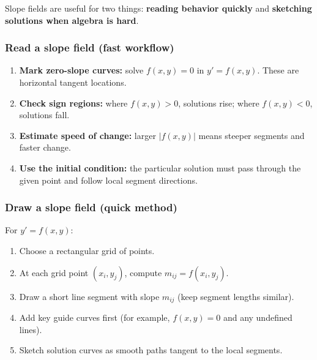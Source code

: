 Slope fields are useful for two things: \textbf{reading behavior quickly} and \textbf{sketching solutions when algebra is hard}.

\subsubsection*{Read a slope field (fast workflow)}
\begin{enumerate}[leftmargin=*]
  \item \textbf{Mark zero-slope curves:} solve $f(x,y)=0$ in $y'=f(x,y)$. These are horizontal tangent locations.
  \item \textbf{Check sign regions:} where $f(x,y)>0$, solutions rise; where $f(x,y)<0$, solutions fall.
  \item \textbf{Estimate speed of change:} larger $|f(x,y)|$ means steeper segments and faster change.
  \item \textbf{Use the initial condition:} the particular solution must pass through the given point and follow local segment directions.
\end{enumerate}

\subsubsection*{Draw a slope field (quick method)}
For $y'=f(x,y)$:
\begin{enumerate}[leftmargin=*]
  \item Choose a rectangular grid of points.
  \item At each grid point $(x_i,y_j)$, compute $m_{ij}=f(x_i,y_j)$.
  \item Draw a short line segment with slope $m_{ij}$ (keep segment lengths similar).
  \item Add key guide curves first (for example, $f(x,y)=0$ and any undefined lines).
  \item Sketch solution curves as smooth paths tangent to the local segments.
\end{enumerate}

